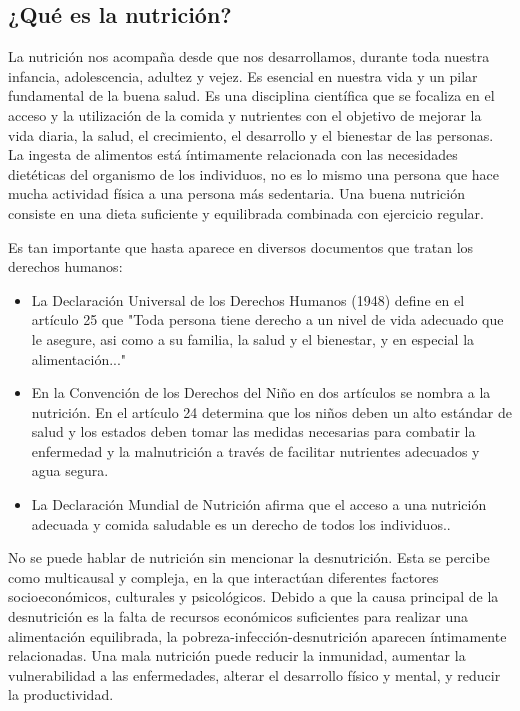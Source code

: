 \subsection{¿Qué es la nutrición?}
\label{nutrición}


La nutrición nos acompaña desde que nos desarrollamos, durante toda nuestra infancia, adolescencia, adultez y vejez. Es esencial en nuestra vida y un pilar fundamental de la buena salud. Es una disciplina científica que se focaliza en el acceso y la utilización de la comida y nutrientes con el objetivo de mejorar la vida diaria, la salud, el crecimiento, el desarrollo y el bienestar de las personas\cite{nutritionForHealthAndDevelopment}. La ingesta de alimentos está íntimamente relacionada con las necesidades dietéticas del organismo de los individuos, no es lo mismo una persona que hace mucha actividad física a una persona más sedentaria. Una buena nutrición consiste en una dieta suficiente y equilibrada combinada con ejercicio regular.

Es tan importante que hasta aparece en diversos documentos que tratan los derechos humanos:

\begin{itemize}
  \item La Declaración Universal de los Derechos Humanos (1948) define en el artículo 25 que "Toda persona tiene derecho a un nivel de vida adecuado que le asegure, asi como a su familia, la salud y el bienestar, y en especial la alimentación..." \cite{declaracionUniversalDDHH}
  \item En la Convención de los Derechos del Niño en dos artículos se nombra a la nutrición. En el artículo 24 determina que los niños deben un alto estándar de salud y los estados deben tomar las medidas necesarias para combatir la enfermedad y la malnutrición a través de facilitar nutrientes adecuados y agua segura\cite{convencionDerechosDelNiño}.
  \item La Declaración Mundial de Nutrición afirma que el acceso a una nutrición adecuada y comida saludable es un derecho de todos los individuos.\cite{declaracionMundialDeNutricion}.
\end{itemize}

No se puede hablar de nutrición sin mencionar la desnutrición. Esta se percibe como multicausal y compleja, en la que interactúan diferentes factores socioeconómicos, culturales y psicológicos. Debido a que la causa principal de la desnutrición es la falta de recursos económicos suficientes para realizar una alimentación equilibrada, la pobreza-infección-desnutrición aparecen íntimamente relacionadas. Una mala nutrición puede reducir la inmunidad, aumentar la vulnerabilidad a las enfermedades, alterar el desarrollo físico y mental, y reducir la productividad\cite{malnutricionInfantil}.
